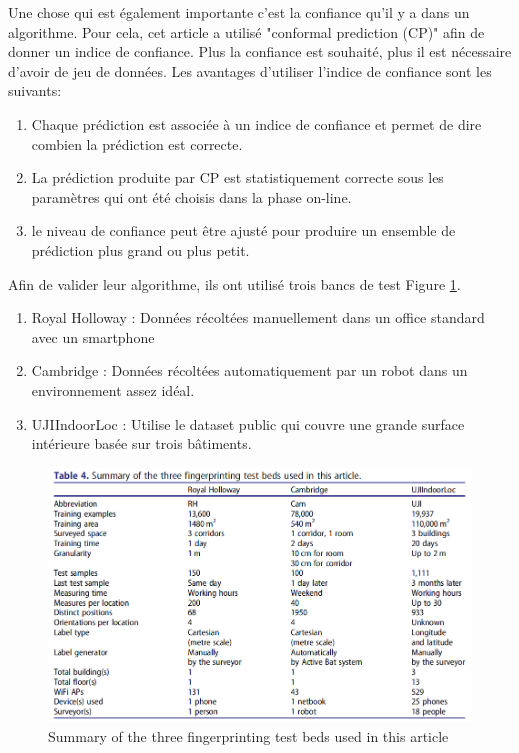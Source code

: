 Une chose qui est également importante c'est la confiance qu'il y a dans un algorithme. Pour cela, cet article a utilisé "conformal prediction (CP)" afin de donner un indice de confiance. Plus la confiance est souhaité, plus il est nécessaire d'avoir de jeu de données. Les avantages d'utiliser l'indice de confiance sont les suivants:

\begin{enumerate}
 \item Chaque prédiction est associée à un indice de confiance et permet de dire combien la prédiction est correcte. 
 \item La prédiction produite par CP est statistiquement correcte sous les paramètres qui ont été choisis dans la phase on-line.
 \item le niveau de confiance peut être ajusté pour produire un ensemble de prédiction plus grand ou plus petit.
\end{enumerate}

Afin de valider leur algorithme, ils ont utilisé trois bancs de test Figure \ref{fig:TestBed}. 

\begin{enumerate}
 \item Royal Holloway : Données récoltées manuellement dans un office standard avec un smartphone
 \item Cambridge : Données récoltées automatiquement par un robot dans un environnement assez idéal.
 \item UJIIndoorLoc : Utilise le dataset public qui couvre une grande surface intérieure basée sur trois bâtiments.
\end{enumerate}

\begin{figure}[htp]
 \begin{center}
  \includegraphics[scale=0.5]{figures/TestBed.png}
  \caption{Summary of the three fingerprinting test beds used in this article \cite{CP_RSS}}
  \label{fig:TestBed} %
 \end{center}
\end{figure}

